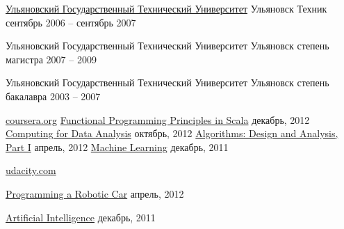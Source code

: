 \documentclass[unicode, 10pt, a4paper, oneside, fleqn]{article}
\begin{document}
\vspace{0.7em}

\headedsection
  {\href{http://www.ulstu.ru}{Ульяновский Государственный Технический Университет}}
  {Ульяновск} {
  \headedsubsection
    {Техник}
    {сентябрь 2006 -- сентябрь 2007}
    {}
}

\spacedhrule{0.5em}{-0.4em}

\headedsection
  {Ульяновский Государственный Технический Университет}
  {Ульяновск} {
  \headedsubsection
    {степень магистра}
    {2007 -- 2009} {
    }
  }

\headedsection
  {Ульяновский Государственный Технический Университет}
  {Ульяновск} {
  \headedsubsection
    {степень бакалавра}
    {2003 -- 2007} {
    }
  }

\spacedhrule{0.5em}{-0.4em}

\headedsection
  {\href{http://www.coursera.org}{coursera.org}}
  {} {
  \headedsubsection
    {\href{https://docs.google.com/document/d/1AWaukQ0K4C-ZcuRRqYANJuYDOPxYH7MoVdXYKHPYJ8I/edit}
          {Functional Programming Principles in Scala}}
    {декабрь, 2012} {}
  \headedsubsection
    {\href{https://docs.google.com/document/d/1Rh_5PSFQBBtEwMZIa5r69H5ONOjpX5jfiPorFIvQg5Y/edit}
          {Computing for Data Analysis}}
    {октябрь, 2012} {}
  \headedsubsection
    {\href{https://docs.google.com/document/d/1j6LlyJUGM03TxqSImyHeHoa16dSCLZQop6zmrPe8YOw/edit}
          {Algorithms: Design and Analysis, Part I}}
    {апрель, 2012} {}
  \headedsubsection
    {\href{https://docs.google.com/document/d/11OT8thqIgBiwM80D_HjpiGtKTz5CnxiITPG_H6QbuUA/edit}
          {Machine Learning}}
    {декабрь, 2011} {}
  }

\headedsection
  {\href{http://udacity.com}{udacity.com}}
  {} {
  \headedsubsection
    {\href{https://docs.google.com/document/d/1LpUyUwh_gGyPyKf-oxTDOy8ncQejwog1jhgMmtf59mY/edit}
          {Programming a Robotic Car}}
    {апрель, 2012} {}

  \headedsubsection
    {\href{https://docs.google.com/document/d/1wD_QEJ7mdzxbR_PMVEbZ_tZ0SyakJ_8Y1gBAj_S5Ufg/edit}
          {Artificial Intelligence}}
    {декабрь, 2011} {}
  }
\end{document}
